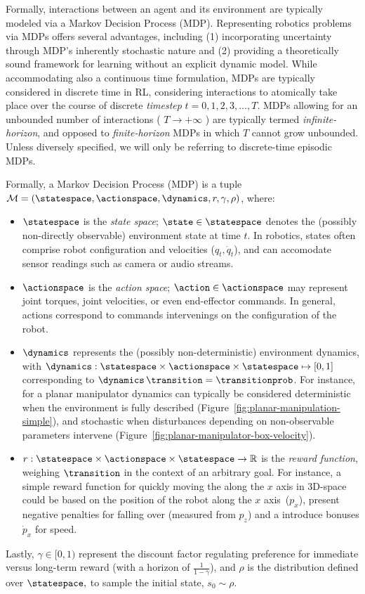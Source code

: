 Formally, interactions between an agent and its environment are typically modeled via a Markov Decision Process (MDP).
Representing robotics problems via MDPs offers several advantages, including (1) incorporating uncertainty through MDP's inherently stochastic nature and (2) providing a theoretically sound framework for learning without an explicit dynamic model.
While accommodating also a continuous time formulation, MDPs are typically considered in discrete time in RL, considering interactions to atomically take place over the course of discrete \emph{timestep} \( t=0,1,2,3, \dots, T \).
MDPs allowing for an unbounded number of interactions ( \( T \to + \infty \) ) are typically termed \emph{infinite-horizon}, and opposed to \emph{finite-horizon} MDPs in which \( T \) cannot grow unbounded.
Unless diversely specified, we will only be referring to discrete-time episodic MDPs.


Formally, a Markov Decision Process (MDP) is a tuple \( \mathcal M = (\statespace, \actionspace, \dynamics, r, \gamma, \rho) \), where:
\begin{itemize}
    \item \(\statespace\) is the \emph{state space}; \(\state \in \statespace\) denotes the (possibly non-directly observable) environment state at time \(t\). In robotics, states often comprise robot configuration and velocities (\(q_t, \dot q_t\)), and can accomodate sensor readings such as camera or audio streams.
    \item \(\actionspace\) is the \emph{action space}; \(\action \in \actionspace\) may represent joint torques, joint velocities, or even end-effector commands. In general, actions correspond to commands intervenings on the configuration of the robot. 
    \item \(\dynamics\) represents the (possibly non-deterministic) environment dynamics, with \(\dynamics: \statespace \times \actionspace \times \statespace \mapsto [0, 1] \) corresponding to \( \dynamics \, \transition = \transitionprob \). For instance, for a planar manipulator dynamics can typically be considered deterministic when the environment is fully described (Figure~\ref{fig:planar-manipulation-simple}), and stochastic when disturbances depending on non-observable parameters intervene (Figure~\ref{fig:planar-manipulator-box-velocity}).
    \item \(r: \statespace \times \actionspace \times \statespace \to \mathbb R\) is the \emph{reward function}, weighing \( \transition \) in the context of an arbitrary goal. For instance, a simple reward function for quickly moving the along the \( x \) axis in 3D-space could be based on the position of the robot along the \( x \) axis~(\(p_x\)), present negative penalties for falling over (measured from \( p_z \)) and a introduce bonuses \( \dot p_x \) for speed.
\end{itemize}
Lastly, \(\gamma \in [0,1)\) represent the discount factor regulating preference for immediate versus long-term reward (with a horizon of \( \tfrac{1}{1-\gamma} \)), and \( \rho \) is the distribution defined over \(\statespace, \) to sample the initial state, \( s_0 \sim \rho \).

